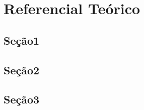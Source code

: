 \chapter{Referencial Teórico}
\label{chap:refteorico}

\section{Seção1}
\label{sec:TMusicalCanto}

\section{Seção2}
\label{sec:EstadoArteF0}

\section{Seção3}
\label{sec:EstimarF0}


 
